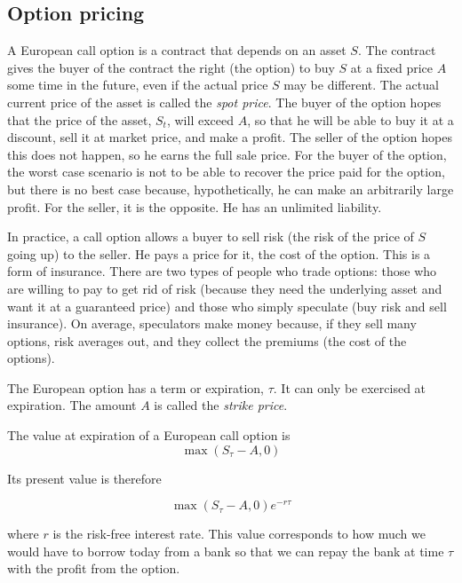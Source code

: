 \documentclass[justified, sixbynine]{tufte-book}
\theoremstyle{plain}%
\newtheorem * {corollary}{Corollary}
\theoremstyle{definition}
\theoremstyle{remark}
\newtheorem * {remark}{Remark}
\newtheorem * {note}{Note}
\begin{document}
\begin{fullwidth}
\goodbreak\section{Option pricing}

A European call option is a contract that depends on an asset $S$. The contract gives the buyer of the contract the right (the option) to buy $S$ at a fixed price $A$ some time in the future, even if the actual price $S$ may be different. The actual current price of the asset is called the {\it spot price}. The buyer of the option hopes that the price of the asset, $S_t$, will exceed $A$, so that he will be able to buy it at a discount, sell it at market price, and make a profit. The seller of the option hopes this does not happen, so he earns the full sale price. For the buyer of the option, the worst case scenario is not to be able to recover the price paid for the option, but there is no best case because, hypothetically, he can make an arbitrarily large profit. For the seller, it is the opposite. He has an unlimited liability.

In practice, a call option allows a buyer to sell risk (the risk of the price of $S$ going up) to the seller. He pays a price for it, the cost of the option. This is a form of insurance. There are two types of people who trade options: those who are willing to pay to get rid of risk (because they need the underlying asset and want it at a guaranteed price) and those who simply speculate (buy risk and sell insurance). On average, speculators make money because, if they sell many options, risk averages out, and they collect the premiums (the cost of the options).

The European option has a term or expiration, $\tau$. It can only be exercised at expiration. The amount $A$ is called the {\it strike price}.

The value at expiration of a European call option is
\begin{equation}
\max (S_\tau -A, 0)
\end{equation}

Its present value is therefore

\begin{equation}
\max (S_\tau -A, 0) e^{-r\tau}
\end{equation}

where $r$ is the risk-free interest rate. This value corresponds to how much we would have to borrow today from a bank so that we can repay the bank at time $\tau$ with the profit from the option.


\end{fullwidth}
\end{document}
